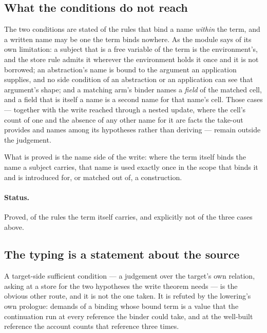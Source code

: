 \documentclass[11pt,a4paper]{article}
\theoremstyle{definition}
\theoremstyle{plain}
\newcommand{\code}[1]{\texttt{\detokenize{#1}}}
\newcommand{\lref}[1]{\code{#1}}
\begin{document}
\subsection{What the conditions do not reach}
\label{sec:reach}

\noindent The two conditions are stated of the rules that bind a name \emph{within}
the term, and a written name may be one the term binds nowhere. As the module says
of its own limitation: a subject that is a free variable of the term is the
environment's, and the store rule admits it wherever the environment holds it once
and it is not borrowed; an abstraction's name is bound to the argument an
application supplies, and no side condition of an abstraction or an application can
see that argument's shape; and a matching arm's binder names a \emph{field} of the
matched cell, and a field that is itself a name is a second name for that name's
cell. Those cases --- together with the write reached through a nested update, where
the cell's count of one and the absence of any other name for it are facts the
take-out provides and \lref{store_owned_is_destructive} names among its hypotheses
rather than deriving --- remain outside the judgement.

What is proved is the name side of the write: where the term itself binds the name
a subject carries, that name is used exactly once in the scope that binds it and is
introduced for, or matched out of, a construction.

\paragraph{Status.} Proved, of the rules the term itself carries, and explicitly
not of the three cases above.

\subsection{The typing is a statement about the source}
\label{sec:at-source}

\noindent A target-side sufficient condition --- a judgement over the target's own
relation, asking at a store for the two hypotheses the write theorem needs --- is
the obvious other route, and it is not the one taken. It is refuted by the
lowering's own prologue: \lref{Runs} demands of a binding whose bound term is a
value that the continuation run at every reference the binder could take, and at
the well-built reference the account counts that reference three times.
\end{document}
